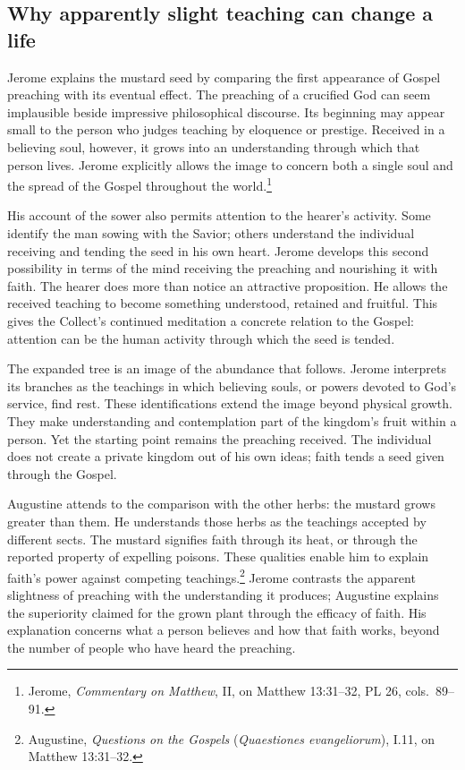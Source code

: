
\subsection{Why apparently slight teaching can change a life}

Jerome explains the mustard seed by comparing the first appearance of Gospel preaching with its eventual effect. The preaching of a crucified God can seem implausible beside impressive philosophical discourse. Its beginning may appear small to the person who judges teaching by eloquence or prestige. Received in a believing soul, however, it grows into an understanding through which that person lives. Jerome explicitly allows the image to concern both a single soul and the spread of the Gospel throughout the world.\footnote{Jerome, \textit{Commentary on Matthew}, II, on Matthew 13:31--32, PL 26, cols.~89--91.}

His account of the sower also permits attention to the hearer's activity. Some identify the man sowing with the Savior; others understand the individual receiving and tending the seed in his own heart. Jerome develops this second possibility in terms of the mind receiving the preaching and nourishing it with faith. The hearer does more than notice an attractive proposition. He allows the received teaching to become something understood, retained and fruitful. This gives the Collect's continued meditation a concrete relation to the Gospel: attention can be the human activity through which the seed is tended.

The expanded tree is an image of the abundance that follows. Jerome interprets its branches as the teachings in which believing souls, or powers devoted to God's service, find rest. These identifications extend the image beyond physical growth. They make understanding and contemplation part of the kingdom's fruit within a person. Yet the starting point remains the preaching received. The individual does not create a private kingdom out of his own ideas; faith tends a seed given through the Gospel.

Augustine attends to the comparison with the other herbs: the mustard grows greater than them. He understands those herbs as the teachings accepted by different sects. The mustard signifies faith through its heat, or through the reported property of expelling poisons. These qualities enable him to explain faith's power against competing teachings.\footnote{Augustine, \textit{Questions on the Gospels} (\textit{Quaestiones evangeliorum}), I.11, on Matthew 13:31--32.} Jerome contrasts the apparent slightness of preaching with the understanding it produces; Augustine explains the superiority claimed for the grown plant through the efficacy of faith. His explanation concerns what a person believes and how that faith works, beyond the number of people who have heard the preaching.

